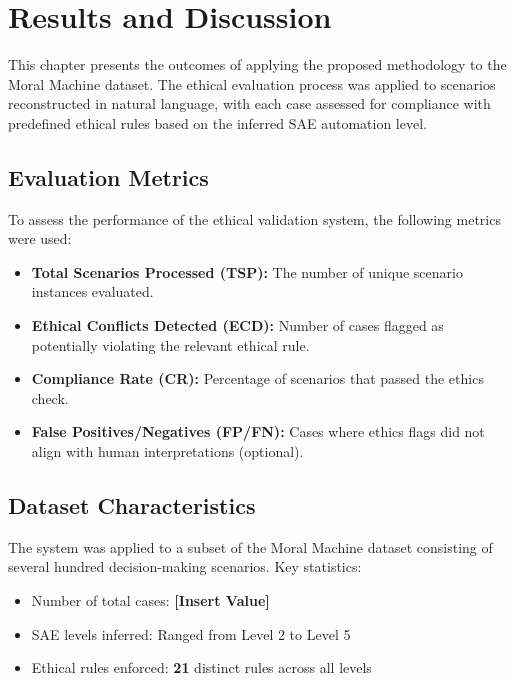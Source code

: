 \chapter{Results and Discussion}
\label{chap:results}

This chapter presents the outcomes of applying the proposed methodology to the Moral Machine dataset. The ethical evaluation process was applied to scenarios reconstructed in natural language, with each case assessed for compliance with predefined ethical rules based on the inferred SAE automation level.

\section{Evaluation Metrics}

To assess the performance of the ethical validation system, the following metrics were used:

\begin{itemize}
    \item \textbf{Total Scenarios Processed (TSP):} The number of unique scenario instances evaluated.
    \item \textbf{Ethical Conflicts Detected (ECD):} Number of cases flagged as potentially violating the relevant ethical rule.
    \item \textbf{Compliance Rate (CR):} Percentage of scenarios that passed the ethics check.
    \item \textbf{False Positives/Negatives (FP/FN):} Cases where ethics flags did not align with human interpretations (optional).
\end{itemize}

\section{Dataset Characteristics}

The system was applied to a subset of the Moral Machine dataset consisting of several hundred decision-making scenarios. Key statistics:

\begin{itemize}
    \item Number of total cases: \textbf{[Insert Value]}
    \item SAE levels inferred: Ranged from Level 2 to Level 5
    \item Ethical rules enforced: \textbf{21} distinct rules across all levels
\end{itemize}

